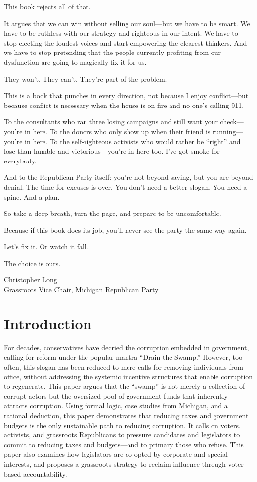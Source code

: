 \documentclass[12pt]{book}
\begin{document}
This book rejects all of that.

It argues that we can win without selling our soul—but we have to be smart. We have to be ruthless with our strategy and righteous in our intent. We have to stop electing the loudest voices and start empowering the clearest thinkers. And we have to stop pretending that the people currently profiting from our dysfunction are going to magically fix it for us.

They won’t. They can’t. They’re part of the problem.

This is a book that punches in every direction, not because I enjoy conflict—but because conflict is necessary when the house is on fire and no one’s calling 911.

To the consultants who ran three losing campaigns and still want your check—you’re in here. To the donors who only show up when their friend is running—you’re in here. To the self-righteous activists who would rather be “right” and lose than humble and victorious—you’re in here too. I’ve got smoke for everybody.

And to the Republican Party itself: you’re not beyond saving, but you are beyond denial. The time for excuses is over. You don’t need a better slogan. You need a spine. And a plan.

So take a deep breath, turn the page, and prepare to be uncomfortable.

Because if this book does its job, you’ll never see the party the same way again.

Let’s fix it. Or watch it fall.

The choice is ours.

\vfill
Christopher Long \\
Grassroots Vice Chair, Michigan Republican Party





\tableofcontents

\chapter{Introduction}

For decades, conservatives have decried the corruption embedded in government, calling for reform under the popular mantra ``Drain the Swamp.'' However, too often, this slogan has been reduced to mere calls for removing individuals from office, without addressing the systemic incentive structures that enable corruption to regenerate. This paper argues that the ``swamp'' is not merely a collection of corrupt actors but the oversized pool of government funds that inherently attracts corruption. Using formal logic, case studies from Michigan, and a rational deduction, this paper demonstrates that reducing taxes and government budgets is the only sustainable path to reducing corruption. It calls on voters, activists, and grassroots Republicans to pressure candidates and legislators to commit to reducing taxes and budgets—and to primary those who refuse. This paper also examines how legislators are co-opted by corporate and special interests, and proposes a grassroots strategy to reclaim influence through voter-based accountability.
\end{document}

